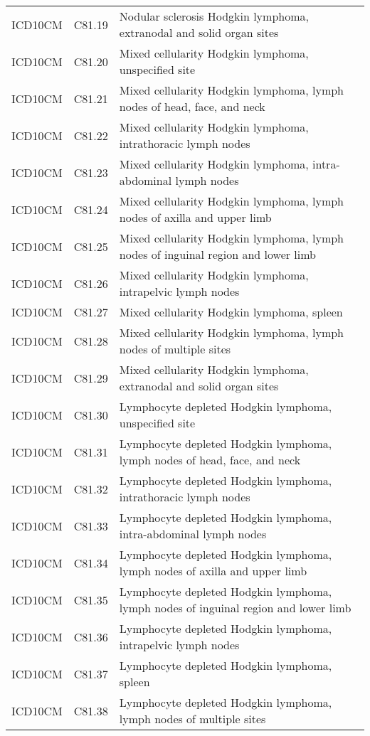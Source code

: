 \begin{longtable}{p{}p{}p{}}
  ICD10CM & C81.19 & Nodular sclerosis Hodgkin lymphoma, extranodal and solid organ sites \\ 
  ICD10CM & C81.20 & Mixed cellularity Hodgkin lymphoma, unspecified site \\ 
  ICD10CM & C81.21 & Mixed cellularity Hodgkin lymphoma, lymph nodes of head, face, and neck \\ 
  ICD10CM & C81.22 & Mixed cellularity Hodgkin lymphoma, intrathoracic lymph nodes \\ 
  ICD10CM & C81.23 & Mixed cellularity Hodgkin lymphoma, intra-abdominal lymph nodes \\ 
  ICD10CM & C81.24 & Mixed cellularity Hodgkin lymphoma, lymph nodes of axilla and upper limb \\ 
  ICD10CM & C81.25 & Mixed cellularity Hodgkin lymphoma, lymph nodes of inguinal region and lower limb \\ 
  ICD10CM & C81.26 & Mixed cellularity Hodgkin lymphoma, intrapelvic lymph nodes \\ 
  ICD10CM & C81.27 & Mixed cellularity Hodgkin lymphoma, spleen \\ 
  ICD10CM & C81.28 & Mixed cellularity Hodgkin lymphoma, lymph nodes of multiple sites \\ 
  ICD10CM & C81.29 & Mixed cellularity Hodgkin lymphoma, extranodal and solid organ sites \\ 
  ICD10CM & C81.30 & Lymphocyte depleted Hodgkin lymphoma, unspecified site \\ 
  ICD10CM & C81.31 & Lymphocyte depleted Hodgkin lymphoma, lymph nodes of head, face, and neck \\ 
  ICD10CM & C81.32 & Lymphocyte depleted Hodgkin lymphoma, intrathoracic lymph nodes \\ 
  ICD10CM & C81.33 & Lymphocyte depleted Hodgkin lymphoma, intra-abdominal lymph nodes \\ 
  ICD10CM & C81.34 & Lymphocyte depleted Hodgkin lymphoma, lymph nodes of axilla and upper limb \\ 
  ICD10CM & C81.35 & Lymphocyte depleted Hodgkin lymphoma, lymph nodes of inguinal region and lower limb \\ 
  ICD10CM & C81.36 & Lymphocyte depleted Hodgkin lymphoma, intrapelvic lymph nodes \\ 
  ICD10CM & C81.37 & Lymphocyte depleted Hodgkin lymphoma, spleen \\ 
  ICD10CM & C81.38 & Lymphocyte depleted Hodgkin lymphoma, lymph nodes of multiple sites \\ 

\end{longtable}

